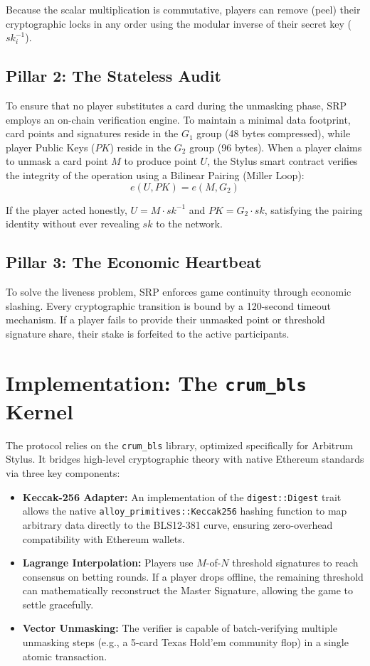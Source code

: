 \documentclass[11pt, a4paper]{article}
\begin{document}
Because the scalar multiplication is commutative, players can remove (peel) their cryptographic locks in any order using the modular inverse of their secret key ($sk_i^{-1}$).

\subsection{Pillar 2: The Stateless Audit}
To ensure that no player substitutes a card during the unmasking phase, SRP employs an on-chain verification engine.
To maintain a minimal data footprint, card points and signatures reside in the $G_1$ group (48 bytes compressed), while player Public Keys ($PK$) reside in the $G_2$ group (96 bytes).
When a player claims to unmask a card point $M$ to produce point $U$, the Stylus smart contract verifies the integrity of the operation using a Bilinear Pairing (Miller Loop):
$$e(U, PK) = e(M, G_2)$$

If the player acted honestly, $U = M \cdot sk^{-1}$ and $PK = G_2 \cdot sk$, satisfying the pairing identity without ever revealing $sk$ to the network.

\subsection{Pillar 3: The Economic Heartbeat}
To solve the liveness problem, SRP enforces game continuity through economic slashing.
Every cryptographic transition is bound by a 120-second timeout mechanism.
If a player fails to provide their unmasked point or threshold signature share, their stake is forfeited to the active participants.

\section{Implementation: The \texttt{crum\_bls} Kernel}
The protocol relies on the \texttt{crum\_bls} library, optimized specifically for Arbitrum Stylus.
It bridges high-level cryptographic theory with native Ethereum standards via three key components:

\begin{itemize}
    \item \textbf{Keccak-256 Adapter:} An implementation of the \texttt{digest::Digest} trait allows the native \texttt{alloy\_primitives::Keccak256} hashing function to map arbitrary data directly to the BLS12-381 curve, ensuring zero-overhead compatibility with Ethereum wallets.
    \item \textbf{Lagrange Interpolation:} Players use $M$-of-$N$ threshold signatures to reach consensus on betting rounds. If a player drops offline, the remaining threshold can mathematically reconstruct the Master Signature, allowing the game to settle gracefully.
    \item \textbf{Vector Unmasking:} The verifier is capable of batch-verifying multiple unmasking steps (e.g., a 5-card Texas Hold'em community flop) in a single atomic transaction.
\end{itemize}
\end{document}
